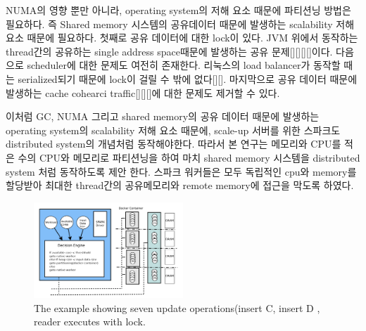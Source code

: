 \fi

\ifkor
NUMA의 영향 뿐만 아니라, operating system의 저해 요소 때문에 
파티션닝 방법은 필요하다.
즉 Shared memory 시스템의 공유데이터 때문에 발생하는 scalability 저해 요소 때문에 필요하다.
첫째로 공유 데이터에 대한 lock이 있다.
JVM 위에서 동작하는 thread간의 공유하는 single address space때문에 발생하는 공유 문제[][][][]이다.
다음으로 scheduler에 대한 문제도 여전히 존재한다. 리눅스의 load balancer가 동작할 때는
serialized되기 때문에 lock이 걸릴 수 밖에 없다[][].
마지막으로 공유 데이터 때문에 발생하는 cache cohearci traffic[][][]에 대한 문제도 제거할 수 있다. 
\else

\fi

\ifkor
이처럼 GC, NUMA 그리고 shared memory의 공유 데이터 때문에 발생하는 operating system의
scalability 저해 요소 때문에, scale-up 서버를 위한 스파크도 distributed system의 개념처럼 
동작해야한다.
따라서 본 연구는 메모리와 CPU를 적은 수의 CPU와 메모리로 파티션닝을 하여 마치 shared memory 시스템을 distributed
system 처럼 동작하도록 제안 한다.
스파크 워커들은 모두 독립적인 cpu와 memory를 할당받아 최대한 thread간의 공유메모리와 remote
memory에 접근을 막도록 하였다.
\else

\fi

\begin{figure}[h]
  \begin{center}
     \includegraphics[width=0.5\textwidth]{fig/jaildocker}
  \end{center}
  \caption{The example showing seven update operations(insert C, insert D ,
  reader executes with lock.}
  \label{fig:basic}
\end{figure}


